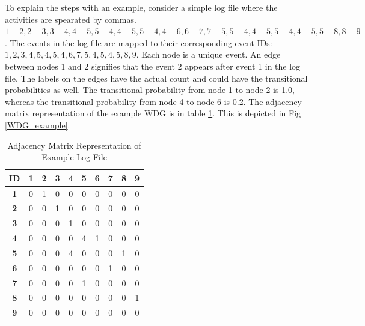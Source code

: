 \begin{enumerate}
To explain the steps with an example, consider a simple log file where the activities are spearated by commas. $1-2, 2-3, 3-4, 4-5, 5-4, 4-5, 5-4, 4-6, 6-7, 7-5, 5-4, 4-5, 5-4, 4-5, 5-8, 8-9$. The events in the log file are mapped to their corresponding event IDs: $1, 2, 3, 4, 5, 4, 5, 4, 6, 7, 5, 4, 5, 4, 5, 8, 9$. Each node is a unique event. An edge between nodes 1 and 2 signifies that the event 2  appears after event 1  in the log file. The labels on the edges have the actual count and could have the transitional probabilities as well. The transitional probability from node 1 to node 2 is 1.0, whereas the transitional probability from node 4 to node 6 is 0.2. The adjacency matrix representation of the example WDG is in table \ref{Adjacency_example_log}. This is depicted in Fig \ref{WDG_example}.

\begin{table}[!t]
\caption{Adjacency Matrix Representation of Example Log File}
\label{Adjacency_example_log}
\centering
\begin{tabular}{|c|c|c|c|c|c|c|c|c|c|}
\hline
  {\bf ID} &    {\bf 1} &    {\bf 2} &    {\bf 3} &    {\bf 4} &    {\bf 5} &    {\bf 6} &    {\bf 7} &    {\bf 8} &    {\bf 9} \\
\hline
   {\bf 1} &          0 &          1 &          0 &          0 &          0 &          0 &          0 &          0 &          0 \\
\hline
   {\bf 2} &          0 &          0 &          1 &          0 &          0 &          0 &          0 &          0 &          0 \\
\hline
   {\bf 3} &          0 &          0 &          0 &          1 &          0 &          0 &          0 &          0 &          0 \\
\hline
   {\bf 4} &          0 &          0 &          0 &          0 &          4 &          1 &          0 &          0 &          0 \\
\hline
   {\bf 5} &          0 &          0 &          0 &          4 &          0 &          0 &          0 &          1 &          0 \\
\hline
   {\bf 6} &          0 &          0 &          0 &          0 &          0 &          0 &          1 &          0 &          0 \\
\hline
   {\bf 7} &          0 &          0 &          0 &          0 &          1 &          0 &          0 &          0 &          0 \\
\hline
   {\bf 8} &          0 &          0 &          0 &          0 &          0 &          0 &          0 &          0 &          1 \\
\hline
   {\bf 9} &          0 &          0 &          0 &          0 &          0 &          0 &          0 &          0 &          0 \\
\hline
\end{tabular}  
\end{table} 


\end{enumerate}
